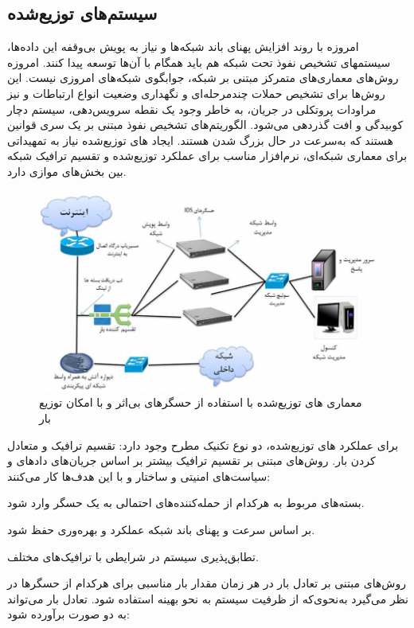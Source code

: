 \documentclass[a4paper,oneside,12pt]{report}
\begin{document}
\subsection{سیستم‌های توزیع‌شده}	
امروزه با روند افزایش پهنای باند شبکه‌ها و نیاز به پویش بی‌وقفه این داده‌ها، سیستمهای تشخیص نفوذ تحت شبکه هم باید همگام با آن‌ها توسعه پیدا کنند. امروزه روش‌های معماری‌های متمرکز مبتنی بر شبکه، جوابگوی شبکه‌های امروزی نیست. این روش‌ها برای تشخیص حملات چندمرحله‌ای و نگهداری وضعیت انواع ارتباطات و نیز مراودات پروتکلی در جریان، به خاطر وجود یک نقطه سرویس‌دهی، سیستم دچار کوبیدگی%
  و افت گذردهی می‌شود. الگوریتم‌های تشخیص نفوذ مبتنی بر یک سری قوانین هستند که به‌سرعت در حال بزرگ شدن هستند. ایجاد 
های 
توزیع‌شده نیاز به تمهیداتی برای معماری شبکه‌ای، نرم‌افزار مناسب برای عملکرد توزیع‌شده و تقسیم ترافیک شبکه بین بخش‌های موازی دارد.
\begin{figure}
\centering
\includegraphics[scale=0.6]{fi3}
\caption{معماری 
های 
توزیع‌شده با استفاده از حسگرهای بی‌اثر و با امکان توزیع بار}\label{fig3}
\end{figure}
  برای عملکرد 
 های 
 توزیع‌شده، دو نوع تکنیک مطرح وجود دارد: تقسیم ترافیک و متعادل کردن بار. روش‌های مبتنی بر تقسیم ترافیک بیشتر بر اساس جریان‌های دادهای و سیاست‌های امنیتی و ساختار 
 و با این هدف‌ها کار می‌کنند:
 
بسته‌های مربوط به هرکدام از حمله‌کننده‌های احتمالی به یک حسگر وارد شود.

 بر اساس سرعت و پهنای باند شبکه عملکرد و بهره‌وری حفظ شود.
 
 تطابق‌پذیری سیستم در شرایطی با ترافیک‌های مختلف.
 
روش‌های مبتنی بر تعادل بار در هر زمان مقدار بار مناسبی برای هرکدام از حسگرها در نظر می‌گیرد به‌نحوی‌که از ظرفیت سیستم به نحو بهینه استفاده شود. تعادل بار می‌تواند به دو صورت برآورده شود:
\end{document}
